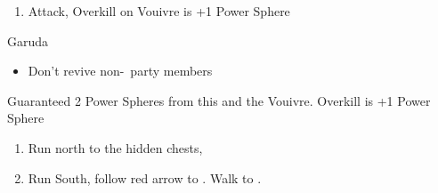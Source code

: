 \begin{enumerate}[resume]
    \item Attack, Overkill on Vouivre is +1 Power Sphere
\end{enumerate}
\begin{battle}[1800]{Garuda}
    \begin{itemize}
        \tidusf Haste \auron
        \auronf Attack x3
        \wakkaf Potion \tidus\ if he has less than 312 HP, Defend
        \tidusf Attack x1, then Defend
        \wakkaf Potion \auron\ if he has less than 202 HP, Defend
        \auronf Attack x3
        \item Don't revive non-\auron\ party members
    \end{itemize}
    Guaranteed 2 Power Spheres from this and the Vouivre. Overkill is +1 Power Sphere
\end{battle}
\begin{enumerate}[resume]
    \item Run north to the hidden chests, 
    \item Run South, follow red arrow to \yuna. Walk to \yuna.
\end{enumerate}
